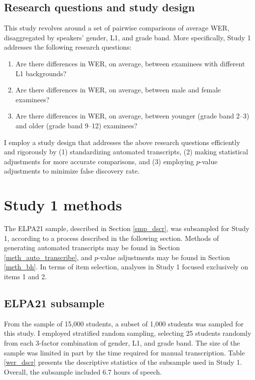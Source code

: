 \documentclass [PhD] {uclathes}
\begin{document}
\subsection{Research questions and study design}

This study revolves around a set of pairwise comparisons of average WER, disaggregated by speakers’ gender, L1, and grade band. More specifically, Study 1 addresses the following research questions:

\begin{enumerate}
	\item Are there differences in WER, on average, between examinees with different L1 backgrounds?
	\item Are there differences in WER, on average, between male and female examinees?
	\item Are there differences in WER, on average, between younger (grade band 2–3) and older (grade band 9–12) examinees?
\end{enumerate}

I employ a study design that addresses the above research questions efficiently and rigorously by (1) standardizing automated transcripts, (2) making statistical adjustments for more accurate comparisons, and (3) employing $p$-value adjustments to minimize false discovery rate.

\section{Study 1 methods}

The ELPA21 sample, described in Section \ref{smp_dscr}, was subsampled for Study 1, according to a process described in the following section. Methods of generating automated transcripts may be found in Section \ref{meth_auto_transcribe}, and $p$-value adjustments may be found in Section \ref{meth_bh}. In terms of item selection, analyses in Study 1 focused exclusively on items 1 and 2. 

\subsection{ELPA21 subsample}

From the sample of 15,000 students, a subset of 1,000 students was sampled for this study. I employed stratified random sampling, selecting 25 students randomly from each 3-factor combination of gender, L1, and grade band. The size of the sample was limited in part by the time required for manual transcription. Table \ref{wer_dscr} presents the descriptive statistics of the subsample used in Study 1. Overall, the subsample included 6.7 hours of speech. 
\end{document}
